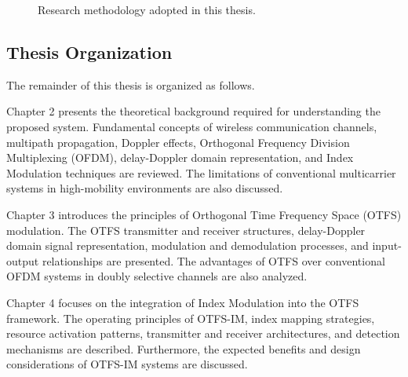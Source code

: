 \begin{figure}[H]
    \centering

    \caption{Research methodology adopted in this thesis.}
    \label{fig:research_methodology}
\end{figure}

\subsection{Thesis Organization}

The remainder of this thesis is organized as follows.

Chapter 2 presents the theoretical background required for understanding the proposed system. Fundamental concepts of wireless communication channels, multipath propagation, Doppler effects, Orthogonal Frequency Division Multiplexing (OFDM), delay-Doppler domain representation, and Index Modulation techniques are reviewed. The limitations of conventional multicarrier systems in high-mobility environments are also discussed.

Chapter 3 introduces the principles of Orthogonal Time Frequency Space (OTFS) modulation. The OTFS transmitter and receiver structures, delay-Doppler domain signal representation, modulation and demodulation processes, and input-output relationships are presented. The advantages of OTFS over conventional OFDM systems in doubly selective channels are also analyzed.

Chapter 4 focuses on the integration of Index Modulation into the OTFS framework. The operating principles of OTFS-IM, index mapping strategies, resource activation patterns, transmitter and receiver architectures, and detection mechanisms are described. Furthermore, the expected benefits and design considerations of OTFS-IM systems are discussed.

